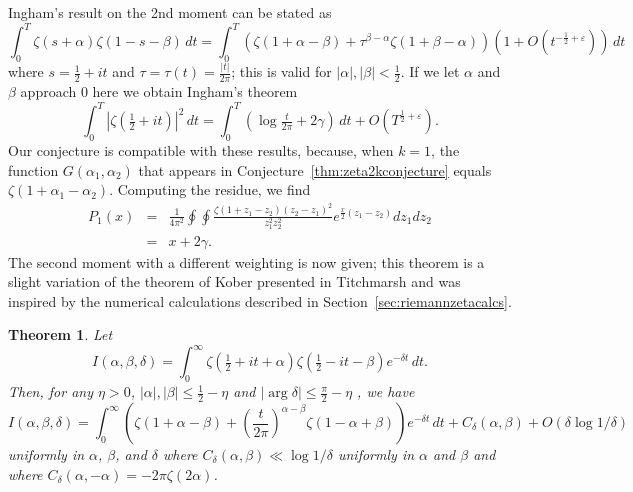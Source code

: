 \documentclass[12pt,letterpaper]{amsart}
\theoremstyle{plain}
\newtheorem{theorem}{Theorem}[section]
\theoremstyle{definition}
\theoremstyle{remark}
\numberwithin{equation}{subsection}
\numberwithin{theorem}{subsection}
\numberwithin{table}{subsection}
\begin{document}
Ingham's result \cite{I} on the 2nd moment can be stated as
\begin{equation}
\int_0^T \zeta(s+\alpha)\zeta(1-s-\beta)\,dt=
\int_0^T (\zeta(1+\alpha-\beta)+\tau^{\beta -\alpha }
\zeta(1+\beta-\alpha))(1+O(t^{-\frac 12+\varepsilon}))\,dt
\end{equation}
where $s=\frac12+it$ and $\tau=\tau(t)=\frac{|t|}{2\pi}$;
this is valid for $|\alpha|, |\beta|<\frac12$. If we let $\alpha$ and
$\beta$ approach 0 here we obtain Ingham's theorem
\begin{equation}
\int_0^T|\zeta(\tfrac12+it)|^2\,dt  = \int_0^T (\log\tfrac t {2\pi}
+2\gamma)\,dt+O(T^{\frac 12 +\varepsilon}).
\end{equation}
Our conjecture is compatible with these results, because, when
$k=1$, the function $G(\alpha_1,\alpha_2)$ that appears in
Conjecture~\ref{thm:zeta2kconjecture} equals $\zeta(1+\alpha_1-\alpha_2)$. Computing
the residue, we find
\begin{eqnarray}
    P_1(x)&  = & \frac{1}{4\pi^2}
             \oint \oint 
\frac{\zeta(1+z_1-z_2)(z_2-z_1)^2 }
                              {z_1^2 z_2^2} 
e^{\frac{x}{2}(z_1-z_2)}
dz_1 dz_2 \nonumber \\&  = & x +2\gamma.
\end{eqnarray}
The second moment with a different weighting is now given; this
theorem is a slight variation of the theorem of Kober presented in
Titchmarsh \cite{T} and was inspired by the numerical calculations
described in Section~\ref{sec:riemannzetacalcs}.

\begin{theorem}
 Let
\begin{equation}I(\alpha,\beta,\delta)=\int_0^\infty  
\zeta(\tfrac12+it+\alpha)\zeta(\tfrac12-it-\beta)
e^{-\delta t}\,dt.\end{equation}
Then, for any $\eta>0$, $|  \alpha|, | \beta|\le \frac12-\eta $ and $|\arg
\delta|\le \frac \pi 2 -\eta$ , we have
\begin{equation}I(\alpha,\beta,\delta)=\int_0^\infty \left(\zeta(1+\alpha-\beta)+
\left(\frac t{2\pi}\right)^{\alpha-\beta}\zeta(1-\alpha+\beta)\right)
e^{-\delta t}\,dt+C_\delta(\alpha,\beta)+O(\delta\log 1/\delta)
\end{equation}
uniformly in $\alpha$, $\beta$, and $\delta$ where $C_\delta(\alpha,\beta)\ll
\log 1/\delta$ uniformly in $\alpha$ and $\beta$  and where
$C_\delta(\alpha,-\alpha)= -2\pi\zeta(2\alpha)$.
\end{theorem}
\end{document}
